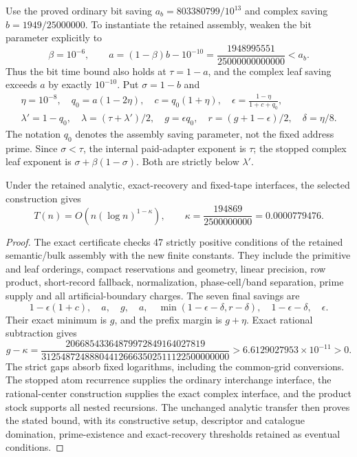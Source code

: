 Use the proved ordinary bit saving $a_b=803380799/10^{13}$ and complex
saving $b=1949/25000000$. To instantiate the retained assembly, weaken
the bit parameter explicitly to
\[
 \beta=10^{-6},\qquad
 a=(1-\beta)b-10^{-10}=\frac{1948995551}{25000000000000}<a_b.
\]
Thus the bit time bound also holds at $\tau=1-a$, and the complex
leaf saving exceeds $a$ by exactly $10^{-10}$. Put $\sigma=1-b$ and
\[
\begin{gathered}
 \eta=10^{-8},\quad q_0=a(1-2\eta),\quad c=q_0(1+\eta),\quad
 \epsilon=\frac{1-\eta}{1+c+q_0},\\
 \lambda'=1-q_0,\quad\lambda=(\tau+\lambda')/2,\quad
 g=\epsilon q_0,\quad r=(g+1-\epsilon)/2,\quad\delta=\eta/8.
\end{gathered}
\]
The notation $q_0$ denotes the assembly saving parameter, not the
fixed address prime. Since $\sigma<\tau$, the internal paid-adapter
exponent is $\tau$; the stopped complex leaf exponent is
$\sigma+\beta(1-\sigma)$. Both are strictly below $\lambda'$.

\begin{theorem}
Under the retained analytic, exact-recovery and fixed-tape interfaces,
the selected construction gives
\[
 T(n)=O\!\left(n(\log n)^{1-\kappa}\right),\qquad
 \boxed{\kappa=\frac{194869}{2500000000}=0.0000779476}.
\]
\end{theorem}
\begin{proof}
The exact certificate checks 47 strictly positive conditions of the
retained semantic/bulk assembly with the new finite constants. They
include the primitive and leaf orderings, compact reservations and
geometry, linear precision, row product, short-record fallback,
normalization, phase-cell/band separation, prime supply and all
artificial-boundary charges. The seven final savings are
\[
 1-\epsilon(1+c),\quad a,\quad g,\quad a,\quad
 \min(1-\epsilon-\delta,r-\delta),\quad
 1-\epsilon-\delta,\quad\epsilon.
\]
Their exact minimum is $g$, and the prefix margin is $g+\eta$.
Exact rational subtraction gives
\[
 g-\kappa=
 \frac{20668543364879972849164027819}
      {312548724888044126663502511122500000000}
 >6.6129027953\times10^{-11}>0.
\]
The strict gaps absorb fixed logarithms, including the common-grid
conversions. The stopped atom recurrence supplies the ordinary
interchange interface, the rational-center construction supplies the
exact complex interface, and the product stock supports all nested
recursions. The unchanged analytic transfer then proves the stated
bound, with its constructive setup, descriptor and catalogue domination,
prime-existence and exact-recovery thresholds retained as eventual
conditions.
\end{proof}
